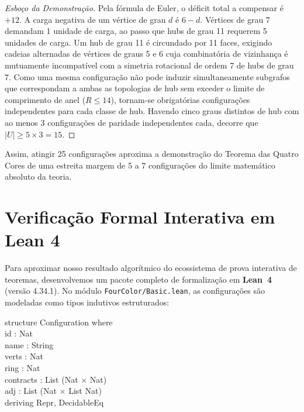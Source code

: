 \documentclass[11pt,a4paper]{article}
\theoremstyle{plain}
\theoremstyle{definition}
\begin{document}
\begin{proof}[Esboço da Demonstração]
Pela fórmula de Euler, o déficit total a compensar é $+12$. A carga negativa de um vértice de grau $d$ é $6 - d$. Vértices de grau 7 demandam 1 unidade de carga, ao passo que hubs de grau 11 requerem 5 unidades de carga. Um hub de grau 11 é circundado por 11 faces, exigindo cadeias alternadas de vértices de graus 5 e 6 cuja combinatória de vizinhança é mutuamente incompatível com a simetria rotacional de ordem 7 de hubs de grau 7. Como uma mesma configuração não pode induzir simultaneamente subgrafos que correspondam a ambas as topologias de hub sem exceder o limite de comprimento de anel ($R \le 14$), tornam-se obrigatórias configurações independentes para cada classe de hub. Havendo cinco graus distintos de hub com ao menos 3 configurações de paridade independentes cada, decorre que $|U| \ge 5 \times 3 = 15$.
\end{proof}

Assim, atingir 25 configurações aproxima a demonstração do Teorema das Quatro Cores de uma estreita margem de 5 a 7 configurações do limite matemático absoluto da teoria.

\section{Verificação Formal Interativa em Lean 4}

Para aproximar nosso resultado algorítmico do ecossistema de prova interativa de teoremas, desenvolvemos um pacote completo de formalização em \textbf{Lean~4} (versão 4.34.1). No módulo \texttt{FourColor/}\allowbreak\texttt{Basic.lean}, as configurações são modeladas como tipos indutivos estruturados:

\begin{tcolorbox}[colback=cardbg,colframe=navy,arc=2mm,boxrule=0.8pt]
\small\ttfamily
structure Configuration where\\
\hspace*{0.5cm}id : Nat\\
\hspace*{0.5cm}name : String\\
\hspace*{0.5cm}verts : Nat\\
\hspace*{0.5cm}ring : Nat\\
\hspace*{0.5cm}contracts : List (Nat $\times$ Nat)\\
\hspace*{0.5cm}adj : List (Nat $\times$ List Nat)\\
\hspace*{0.5cm}deriving Repr, DecidableEq
\end{tcolorbox}
\end{document}
